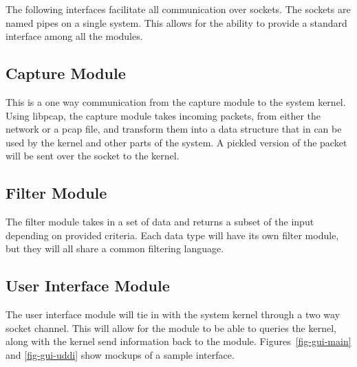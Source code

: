 \documentclass[titlepage]{article}
\begin{document}
The following interfaces facilitate all communication over sockets. The sockets
are named pipes on a single system. This allows for the ability to provide a
standard interface among all the modules.


\subsection{Capture Module
    \label{capture}
}
This is a one way communication from the capture module to the system kernel.
Using libpcap, the capture module takes incoming packets, from either the
network or a pcap file, and transform them into a data structure that in can
be used by the kernel and other parts of the system. A pickled version of the
packet will be sent over the socket to the kernel.



\subsection{Filter Module
    \label{filter}
}
The filter module takes in a set of data and returns a subset of the input
depending on provided criteria. Each data type will have its own filter module,
but they will all share a common filtering language.



\subsection{User Interface Module
    \label{ui}
}

The user interface module will tie in with the system kernel through a two way
socket channel. This will allow for the module to be able to queries the
kernel, along with the kernel send information back to the module.
Figures~\ref{fig-gui-main} and \ref{fig-gui-uddi} show mockups of a sample
interface.
\end{document}
